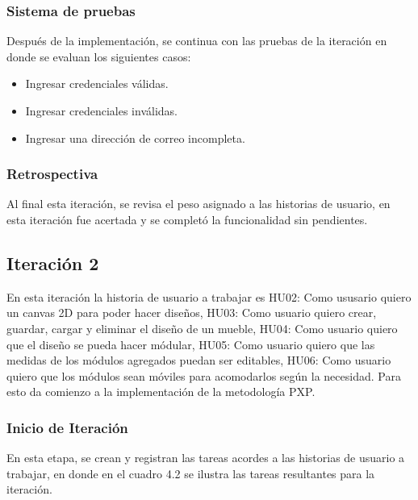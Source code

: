 ﻿\documentclass{iccmemoria}
\begin{document}
\subsubsection{Sistema de pruebas}
Después de la implementación, se continua con las pruebas de la iteración en donde se evaluan los siguientes casos:
\begin{itemize}
    \item Ingresar credenciales válidas.
    \item Ingresar credenciales inválidas.
    \item Ingresar una dirección de correo incompleta.
\end{itemize}

\subsubsection{Retrospectiva}
Al final esta iteración, se revisa el peso asignado a las historias de usuario, en esta iteración fue acertada y se completó la funcionalidad sin pendientes.

\subsection{Iteración 2}
En esta iteración la historia de usuario a trabajar es HU02: Como ususario quiero un canvas 2D para poder hacer diseños, HU03: Como usuario quiero crear, guardar, cargar y eliminar el diseño de un mueble, HU04: Como usuario quiero que el diseño se pueda hacer módular, HU05: Como usuario quiero que las medidas de los módulos agregados puedan ser editables, HU06: Como usuario quiero que los módulos sean móviles para acomodarlos según la necesidad. Para esto da comienzo a la implementación de la metodología PXP.  

\subsubsection{Inicio de Iteración}
En esta etapa, se crean y registran las tareas acordes a las historias de usuario a trabajar, en donde en el cuadro 4.2 se ilustra las tareas resultantes para la iteración.
\end{document}

